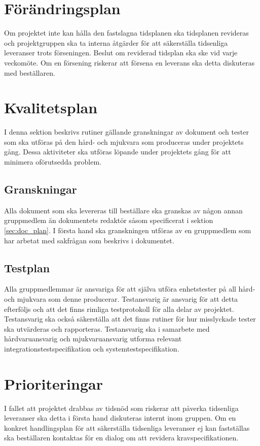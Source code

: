 \documentclass[a4paper,11pt]{article}
\begin{document}
\section{Förändringsplan}
Om projektet inte kan hålla den fastslagna tidsplanen ska tidsplanen revideras och projektgruppen ska ta interna åtgärder för att säkerställa tidsenliga leveranser trots förseningen. Beslut om reviderad tidsplan ska ske vid varje veckomöte. Om en försening riskerar att försena en leverans ska detta diskuteras med beställaren.

\section{Kvalitetsplan}
I denna sektion beskrivs rutiner gällande granskningar av dokument och tester som ska utföras på den hård- och mjukvara som produceras under projektets gång. Dessa aktiviteter ska utföras löpande under projektets gång för att minimera oförutsedda problem.

\subsection{Granskningar}
Alla dokument som ska levereras till beställare ska granskas av någon annan gruppmedlem än dokumentets redaktör såsom specificerat i sektion \ref{sec:doc_plan}. I första hand ska granskningen utföras av en gruppmedlem som har arbetat med sakfrågan som beskrivs i dokumentet.

\subsection{Testplan}
Alla gruppmedlemmar är ansvariga för att själva utföra enhetstester på all hård- och mjukvara som denne producerar. Testansvarig är ansvarig för att detta efterföljs och att det finns rimliga testprotokoll för alla delar av projektet. Testansvarig ska också säkerställa att det finns rutiner för hur misslyckade tester ska utvärderas och rapporteras. Testansvarig ska i samarbete med hårdvaruansvarig och mjukvaruansvarig utforma relevant integrationstestspecifikation och systemtestspecifikation.


\section{Prioriteringar}
I fallet att projektet drabbas av tidsnöd som riskerar att påverka tidsenliga leveranser ska detta i första hand diskuteras internt inom gruppen. Om en konkret handlingsplan för att säkerställa tidsenliga leveranser ej kan fastställas ska beställaren kontaktas för en dialog om att revidera kravspecifikationen.
\end{document}
